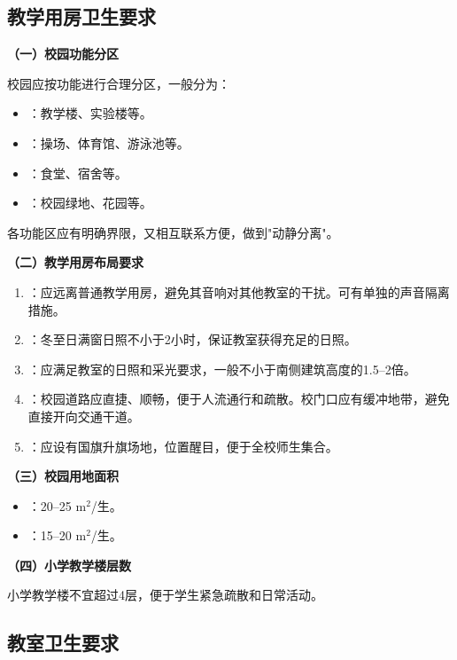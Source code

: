 \subsection{教学用房卫生要求}

\begin{keybox}
\textbf{（一）校园功能分区}

校园应按功能进行合理分区，一般分为：
\begin{itemize}[leftmargin=*]
    \item {}：教学楼、实验楼等。
    \item {}：操场、体育馆、游泳池等。
    \item {}：食堂、宿舍等。
    \item {}：校园绿地、花园等。
\end{itemize}

各功能区应有明确界限，又相互联系方便，做到"动静分离"。

\textbf{（二）教学用房布局要求}

\begin{enumerate}[leftmargin=*]
    \item {}：应远离普通教学用房，避免其音响对其他教室的干扰。可有单独的声音隔离措施。
    \item {}：冬至日满窗日照不小于2小时，保证教室获得充足的日照。
    \item {}：应满足教室的日照和采光要求，一般不小于南侧建筑高度的1.5--2倍。
    \item {}：校园道路应直捷、顺畅，便于人流通行和疏散。校门口应有缓冲地带，避免直接开向交通干道。
    \item {}：应设有国旗升旗场地，位置醒目，便于全校师生集合。
\end{enumerate}

\textbf{（三）校园用地面积}

\begin{itemize}[leftmargin=*]
    \item {}：20--25 $\mathrm{m}^2$/生。
    \item {}：15--20 $\mathrm{m}^2$/生。
\end{itemize}

\textbf{（四）小学教学楼层数}

小学教学楼不宜超过4层，便于学生紧急疏散和日常活动。
\end{keybox}

\subsection{教室卫生要求}

